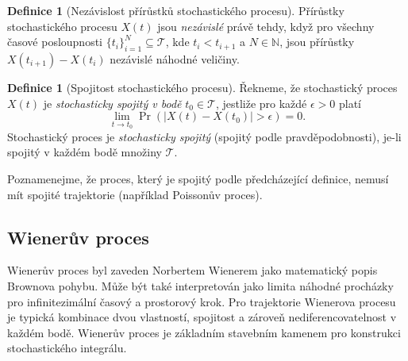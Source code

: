 \documentclass[a4paper,12pt]{report}
\theoremstyle{definition} \newtheorem{definice}[veta]{Definice}
\theoremstyle{remark}
\begin{document}
\begin{definice}[Nezávislost přírůstků stochastického procesu]
Přírůstky stochastického procesu $X(t)$ jsou \textit{nezávislé} právě tehdy, když pro všechny časové posloupnosti $\{t_i\}_{i=1}^N\subseteq\mathcal{T}$, kde $t_i<t_{i+1}$ a $N\in\mathbb{N}$, jsou přírůstky $X(t_{i+1})-X(t_i)$ nezávislé náhodné veličiny.
\end{definice}

\begin{definice}[Spojitost stochastického procesu]
Řekneme, že stochastický proces $X(t)$ je \textit{stochasticky spojitý v bodě} $t_0\in\mathcal{T}$, jestliže pro každé $\epsilon>0$ platí
$$\lim_{t\to t_0}\Pr(|X(t)-X(t_0)|>\epsilon)=0.$$
Stochastický proces je  \textit{stochasticky spojitý} (spojitý podle pravděpodobnosti), je-li spojitý v každém bodě množiny $\mathcal{T}$.
\end{definice}
Poznamenejme, že proces, který je spojitý podle předcházející definice, nemusí mít spojité trajektorie (například Poissonův proces).


\subsection{Wienerův proces}\label{WP_kap}
Wienerův proces byl zaveden Norbertem Wienerem jako matematický popis Brownova pohybu.
Může být také interpretován jako limita náhodné procházky pro infinitezimální časový a prostorový krok.
Pro trajektorie Wienerova procesu je typická kombinace dvou vlastností, spojitost a zároveň nediferencovatelnost v každém bodě.
Wienerův proces je základním stavebním kamenem pro konstrukci stochastického integrálu.
\end{document}

